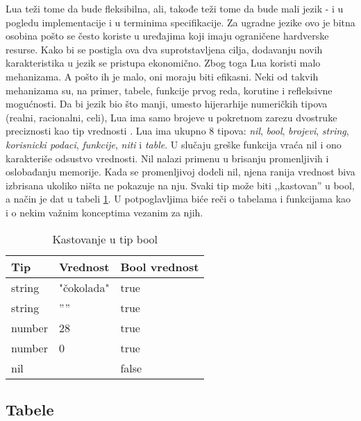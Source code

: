 \documentclass[a4paper]{article}
\begin{document}
Lua teži tome da bude fleksibilna, ali, takođe teži tome da bude mali jezik - i u pogledu implementacije i u terminima specifikacije. Za ugradne jezike ovo je bitna osobina pošto se često koriste u uređajima koji imaju ograničene hardverske resurse. Kako bi se postigla ova dva suprotstavljena cilja, dodavanju novih karakteristika u jezik se pristupa ekonomično. Zbog toga Lua koristi malo mehanizama. A pošto ih je malo, oni moraju biti efikasni. Neki od takvih mehanizama su, na primer, tabele, funkcije prvog reda, korutine i refleksivne mogućnosti. Da bi jezik bio što manji, umesto hijerarhije numeričkih tipova (realni, racionalni, celi), Lua ima samo brojeve u pokretnom zarezu dvostruke preciznosti kao tip vrednosti \cite{multiParadigms}.
Lua ima ukupno 8 tipova: \textit{nil}, \textit{bool}, \textit{brojevi}, \textit{string}, \textit{korisnicki podaci}, \textit{funkcije}, \textit{niti} i \textit{table}. U slučaju greške funkcija vraća nil i ono karakteriše odsustvo vrednosti. Nil nalazi primenu u brisanju promenljivih i oslobađanju memorije. Kada se promenljivoj dodeli nil, njena ranija vrednost biva izbrisana ukoliko ništa ne pokazuje na nju. Svaki tip može biti ,,kastovan'' u bool, a način je dat u tabeli \ref{kastovanje}. U potpoglavljima biće reči o tabelama i funkcijama kao i o nekim važnim konceptima vezanim za njih.

\begin{table}[h!]
\begin{center}
\begin{tabular}{|l|l|l|}
\hline
Tip & Vrednost & Bool vrednost \\
\hline
string &  "čokolada" &  true \\
\hline
string  & '''' &  true \\
\hline
number &  28 &  true \\
\hline
number & 0 &  true \\
\hline
nil &   & false \\
\hline 
\end{tabular}
\caption{Kastovanje u tip bool}
\label{kastovanje}
\end{center}
\end{table}

\subsection{Tabele}
\label{sec:tabele}

\end{document}
